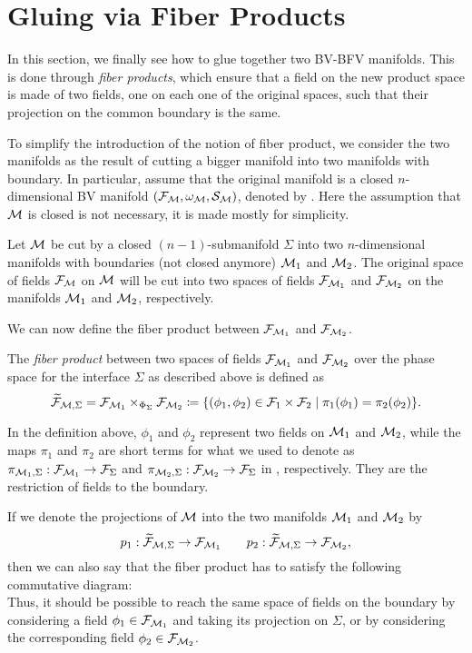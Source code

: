 \section{Gluing via Fiber Products}
\label{sec:gluing_fiber_prod}

In this section, we finally see how to glue together two BV-BFV manifolds.
This is done through \emph{fiber products}, which ensure that a field on the new product space is made of two fields, one on each one of the original spaces, such that their projection on the common boundary is the same.

To simplify the introduction of the notion of fiber product, we consider the two manifolds as the result of cutting a bigger manifold into two manifolds with boundary.
In particular, assume that the original manifold is a closed $n$-dimensional BV manifold $(\mathcal{F}_{\mathcal{M}}, \omega_{\mathcal{M}}, \mathcal{S}_{\mathcal{M}})$, denoted by \M.
Here the assumption that $\mathcal{M}$ is closed is not necessary, it is made mostly for simplicity.

Let $\mathcal{M}$ be cut by a closed $(n-1)$-submanifold $\Sigma$ into two $n$-dimensional manifolds with boundaries (not closed anymore) $\mathcal{M}_1$ and $\mathcal{M}_2$.
The original space of fields $\mathcal{F}_{\mathcal{M}}$ on $\mathcal{M}$ will be cut into two spaces of fields $\mathcal{F}_{\mathcal{M}_1}$ and $\mathcal{F}_{\mathcal{M}_2}$ on the manifolds $\mathcal{M}_1$ and $\mathcal{M}_2$, respectively.

We can now define the fiber product between $\mathcal{F}_{\mathcal{M}_1}$ and $\mathcal{F}_{\mathcal{M}_2}$.

\begin{definition}
    The \emph{fiber product} between two spaces of fields $\mathcal{F}_{\mathcal{M}_1}$ and $\mathcal{F}_{\mathcal{M}_2}$ over the phase space for the interface $\Sigma$ as described above is defined as
    \begin{equation}
    \label{eq:fiber_prod}
        \widetilde{\mathcal{F}}_{\mathcal{M}, \Sigma} = \mathcal{F}_{\mathcal{M}_1} \times_{\Phi_\Sigma} \mathcal{F}_{\mathcal{M}_2} 
        \coloneqq \{(\phi_1, \phi_2) \in \mathcal{F}_1 \times \mathcal{F}_2 \; | \;
        \pi_1(\phi_1) = \pi_2(\phi_2) \} .
    \end{equation}
\end{definition}

In the definition above, $\phi_1$ and $\phi_2$ represent two fields on $\mathcal{M}_1$ and $\mathcal{M}_2$, while the maps $\pi_1$ and $\pi_2$ are short terms for what we used to denote as $\pi_{\mathcal{M}_1, \Sigma}: \mathcal{F}_{\mathcal{M}_1} \rightarrow \mathcal{F}_\Sigma$ and $\pi_{\mathcal{M}_2, \Sigma}: \mathcal{F}_{\mathcal{M}_2} \rightarrow \mathcal{F}_\Sigma$ in , respectively.
They are the restriction of fields to the boundary.

If we denote the projections of $\mathcal{M}$ into the two manifolds $\mathcal{M}_1$ and $\mathcal{M}_2$ by
\begin{equation*}
    p_1: \widetilde{\mathcal{F}}_{\mathcal{M}, \Sigma} \rightarrow \mathcal{F}_{\mathcal{M}_1} 
    \qquad
    p_2: \widetilde{\mathcal{F}}_{\mathcal{M}, \Sigma} \rightarrow \mathcal{F}_{\mathcal{M}_2},
\end{equation*}
then we can also say that the fiber product has to satisfy the following commutative diagram:
\begin{equation*}
    
\end{equation*}
Thus, it should be possible to reach the same space of fields on the boundary by considering a field $\phi_1 \in \mathcal{F}_{\mathcal{M}_1}$ and taking its projection on $\Sigma$, or by considering the corresponding field $\phi_2 \in \mathcal{F}_{\mathcal{M}_2}$.

